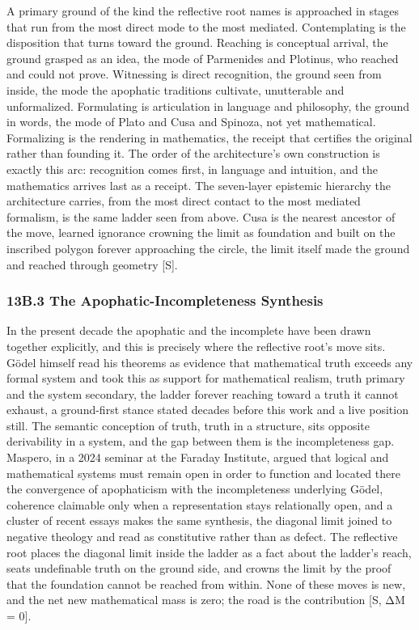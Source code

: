 \documentclass[10pt,twocolumn]{article}
\begin{document}
A primary ground of the kind the reflective root names is approached in
stages that run from the most direct mode to the most mediated.
Contemplating is the disposition that turns toward the ground. Reaching
is conceptual arrival, the ground grasped as an idea, the mode of
Parmenides and Plotinus, who reached and could not prove. Witnessing is
direct recognition, the ground seen from inside, the mode the apophatic
traditions cultivate, unutterable and unformalized. Formulating is
articulation in language and philosophy, the ground in words, the mode
of Plato and Cusa and Spinoza, not yet mathematical. Formalizing is the
rendering in mathematics, the receipt that certifies the original rather
than founding it. The order of the architecture's own construction is
exactly this arc: recognition comes first, in language and intuition,
and the mathematics arrives last as a receipt. The seven-layer epistemic
hierarchy the architecture carries, from the most direct contact to the
most mediated formalism, is the same ladder seen from above. Cusa is the
nearest ancestor of the move, learned ignorance crowning the limit as
foundation and built on the inscribed polygon forever approaching the
circle, the limit itself made the ground and reached through geometry
{[}S{]}.

\hypertarget{b.3-the-apophatic-incompleteness-synthesis}{%
\subsubsection{13B.3 The Apophatic-Incompleteness
Synthesis}\label{b.3-the-apophatic-incompleteness-synthesis}}

In the present decade the apophatic and the incomplete have been drawn
together explicitly, and this is precisely where the reflective root's
move sits. Gödel himself read his theorems as evidence that mathematical
truth exceeds any formal system and took this as support for
mathematical realism, truth primary and the system secondary, the ladder
forever reaching toward a truth it cannot exhaust, a ground-first stance
stated decades before this work and a live position still. The semantic
conception of truth, truth in a structure, sits opposite derivability in
a system, and the gap between them is the incompleteness gap. Maspero,
in a 2024 seminar at the Faraday Institute, argued that logical and
mathematical systems must remain open in order to function and located
there the convergence of apophaticism with the incompleteness underlying
Gödel, coherence claimable only when a representation stays relationally
open, and a cluster of recent essays makes the same synthesis, the
diagonal limit joined to negative theology and read as constitutive
rather than as defect. The reflective root places the diagonal limit
inside the ladder as a fact about the ladder's reach, seats undefinable
truth on the ground side, and crowns the limit by the proof that the
foundation cannot be reached from within. None of these moves is new,
and the net new mathematical mass is zero; the road is the contribution
{[}S, ΔM = 0{]}.
\end{document}

